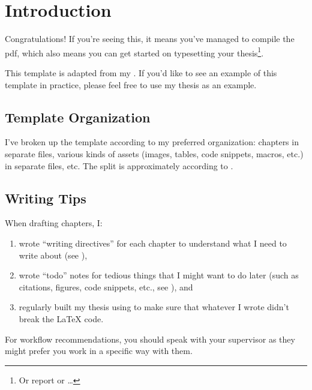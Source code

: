 \chapter{Introduction}
\label{chap:introduction}

Congratulations! If you're seeing this, it means you've managed to compile the
\acs{pdf}, which also means you can get started on typesetting your
thesis\footnote{Or report or \ldots{}}.

This template is adapted from my
.
If you'd like to see an example of this template in practice, please feel free
to use my thesis as an example.

\section{Template Organization}
\label{chap:introduction:sec:template-organization}

I've broken up the template according to my preferred organization: chapters in
separate files, various kinds of assets (images, tables, code snippets, macros,
etc.) in separate files, etc. The split is approximately according to
.

\organizationTable{}

\section{Writing Tips}
\label{chap:introduction:sec:writing-tips}

When drafting chapters, I:

\begin{enumerate}
      \item wrote ``writing directives'' for each chapter to understand what I
            need to write about (see ),
      \item wrote ``todo'' notes for tedious things that I might want to do
            later (such as citations, figures, code snippets, etc., see
            ), and
      \item regularly built my thesis using  to
            make sure that whatever I wrote didn't break the \LaTeX{} code.
\end{enumerate}

For workflow recommendations, you should speak with your supervisor as they
might prefer you work in a specific way with them.

